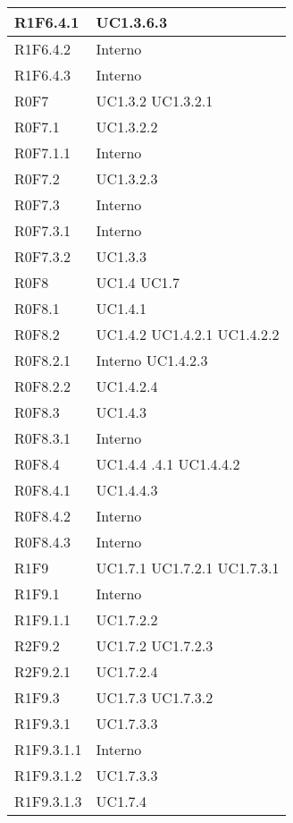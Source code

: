 \begin{center}
\begin{longtable}{| p{4cm} | p{4cm} |}
		\hline
		R1F6.4.1  &  UC1.3.6.3 \\
		\hline
		R1F6.4.2  &  Interno \\
		\hline
		R1F6.4.3  &  Interno \\
		\hline
		R0F7  &  UC1.3.2 \newline UC1.3.2.1 \\
		\hline
		R0F7.1  &  UC1.3.2.2 \\
		\hline
		R0F7.1.1  &  Interno \\
		\hline
		R0F7.2  &  UC1.3.2.3 \\
		\hline
		R0F7.3  &  Interno \\
		\hline
		R0F7.3.1  &  Interno \\
		\hline
		R0F7.3.2  &  UC1.3.3 \\
		\hline
		R0F8  &  UC1.4 \newline UC1.7 \\
		\hline
		R0F8.1  &  UC1.4.1 \\
		\hline
		R0F8.2  &  UC1.4.2 \newline UC1.4.2.1 \newline UC1.4.2.2 \\
		\hline
		R0F8.2.1  &  Interno \newline UC1.4.2.3 \\
		\hline
		R0F8.2.2  &  UC1.4.2.4 \\
		\hline
		R0F8.3  &  UC1.4.3 \\
		\hline
		R0F8.3.1  &  Interno \\
		\hline
		R0F8.4  &  UC1.4.4 \newline 1.4.4.1 \newline UC1.4.4.2 \\
		\hline
		R0F8.4.1  &  UC1.4.4.3 \\
		\hline
		R0F8.4.2  &  Interno \\
		\hline
		R0F8.4.3  &  Interno \\
		\hline
		R1F9  &  UC1.7.1 \newline UC1.7.2.1 \newline UC1.7.3.1 \\
		\hline
		R1F9.1  &  Interno \\
		\hline
		R1F9.1.1  &  UC1.7.2.2 \\
		\hline
		R2F9.2  &  UC1.7.2 \newline UC1.7.2.3  \\
		\hline
		R2F9.2.1  &  UC1.7.2.4 \\
		\hline
		R1F9.3  & UC1.7.3  \newline UC1.7.3.2 \\
		\hline
		R1F9.3.1  &  UC1.7.3.3\\
		\hline
		R1F9.3.1.1  &  Interno \\
		\hline
		R1F9.3.1.2  &  UC1.7.3.3\\
		\hline
		R1F9.3.1.3  &  UC1.7.4\\
		\hline



\end{longtable}
\end{center}
